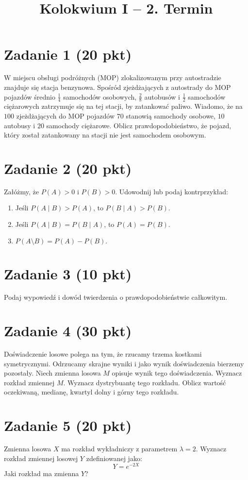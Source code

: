 \documentclass[polish, 10pt]{extarticle}
\begin{document}
\title{Kolokwium I -- 2. Termin}
\author{}
\date{}

\maketitle
\vspace{-2cm}

\section*{Zadanie 1 (20 pkt)}
W miejscu obsługi podróżnych (MOP) zlokalizowanym przy autostradzie znajduje się stacja benzynowa. Spośród zjeżdżających z autostrady do MOP pojazdów średnio $\frac{1}{4}$ samochodów osobowych, $\frac{2}{8}$ autobusów i $\frac{1}{2}$ samochodów ciężarowych zatrzymuje się na tej stacji, by zatankować paliwo. Wiadomo, że na $100$ zjeżdżających do MOP pojazdów $70$ stanowią samochody osobowe, $10$ autobusy i $20$ samochody ciężarowe. Oblicz prawdopodobieństwo, że pojazd, który został zatankowany na stacji nie jest samochodem osobowym.

\section*{Zadanie 2 (20 pkt)}
Załóżmy, że $P(A) > 0$ i $P(B) > 0$. Udowodnij lub podaj kontrprzykład:

\begin{enumerate}
    \item[(a)] Jeśli $P(A \mid B) > P(A)$, to $P(B \mid A) > P(B)$.
    \item[(b)] Jeśli $P(A \mid B) = P(B \mid A)$, to $P(A) = P(B)$.
    \item[(c)] $P(A \setminus B) = P(A) - P(B)$.
\end{enumerate}

\section*{Zadanie 3 (10 pkt)}
Podaj wypowiedź i dowód twierdzenia o prawdopodobieństwie całkowitym.

\section*{Zadanie 4 (30 pkt)}
Doświadczenie losowe polega na tym, że rzucamy trzema
kostkami symetrycznymi. Odrzucamy skrajne wyniki i 
jako wynik doświadczenia bierzemy pozostały. Niech zmienna
losowa $M$ opisuje wynik tego doświadczenia.
Wyznacz rozkład zmiennej $M$. Wyznacz dystrybuantę tego rozkładu.
Oblicz wartość oczekiwaną, medianę, kwartyl dolny i górny tego rozkładu.

\section*{Zadanie 5 (20 pkt)}
Zmienna losowa $X$ ma rozkład wykładniczy z parametrem $\lambda = 2$. Wyznacz rozkład zmiennej losowej $Y$ zdefiniowanej jako:
\[
Y = e^{-2X}
\]
Jaki rozkład ma zmienna $Y$?
\end{document}
